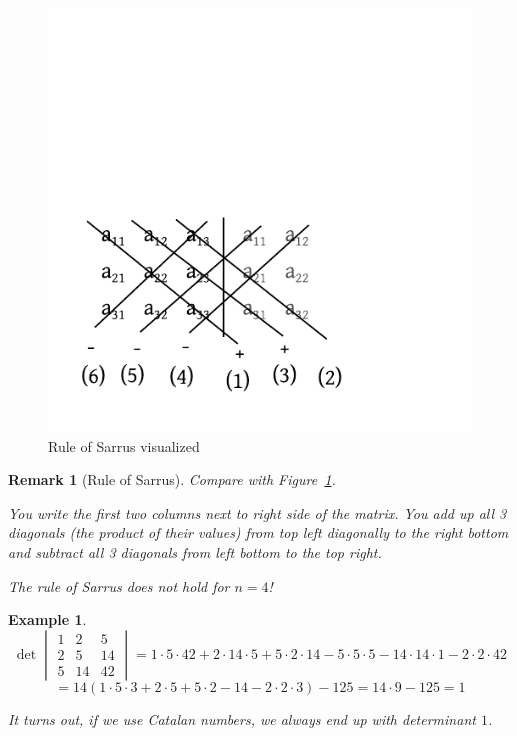 \documentclass[a4paper,landscape,twocolumn]{article}
\newtheorem{ex}{Example}
\newtheorem{rem}{Remark}
\begin{document}
\begin{figure}[!h]
  \begin{center}
    \includegraphics{img/rule_of_sarrus.pdf}
    \caption{Rule of Sarrus visualized}
    \label{img:sarrus}
  \end{center}
\end{figure}

\begin{rem}[Rule of Sarrus]
  Compare with Figure~\ref{img:sarrus}.

  You write the first two columns next to right side of the matrix.
  You add up all 3 diagonals (the product of their values) from top left diagonally to the right bottom
  and subtract all 3 diagonals from left bottom to the top right.

  The rule of Sarrus does not hold for $n=4$!
\end{rem}

\begin{ex}
  \[
    \det\begin{vmatrix} 1 & 2 & 5 \\ 2 & 5 & 14 \\ 5 & 14 & 42 \end{vmatrix}
      = 1 \cdot 5 \cdot 42 + 2 \cdot 14 \cdot 5 + 5 \cdot 2 \cdot 14
      - 5 \cdot 5 \cdot 5 - 14 \cdot 14 \cdot 1 - 2 \cdot 2 \cdot 42
  \] \[
    = 14 (1 \cdot 5 \cdot 3 + 2 \cdot 5 + 5 \cdot 2 - 14 - 2 \cdot 2 \cdot 3) - 125
    = 14 \cdot 9 - 125 = 1
  \]

  It turns out, if we use Catalan numbers, we always end up with determinant $1$.
\end{ex}
\end{document}
